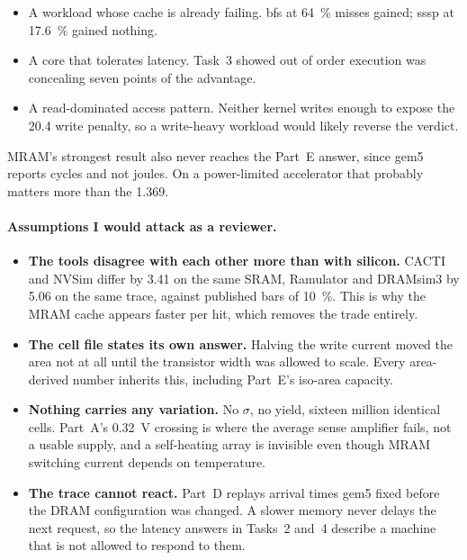 \documentclass[9pt,a4paper]{extarticle}
\begin{document}
\begin{itemize}
\item A workload whose cache is already failing. bfs at \SI{64}{\percent}
misses gained; sssp at \SI{17.6}{\percent} gained nothing.
\item A core that tolerates latency. Task~3 showed out of order execution
was concealing seven points of the advantage.
\item A read-dominated access pattern. Neither kernel writes enough to
expose the \SI{20.4}{\times} write penalty, so a write-heavy workload
would likely reverse the verdict.
\end{itemize}

MRAM's strongest result also never reaches the Part~E answer, since gem5
reports cycles and not joules. On a power-limited accelerator that
probably matters more than the \SI{1.369}{\times}.

\paragraph{Assumptions I would attack as a reviewer.}

\begin{itemize}
\item \textbf{The tools disagree with each other more than with silicon.}
CACTI and NVSim differ by \SI{3.41}{\times} on the same SRAM, Ramulator
and DRAMsim3 by \SI{5.06}{\times} on the same trace, against published
bars of \SI{10}{\percent}. This is why the MRAM cache appears faster per
hit, which removes the trade entirely.

\item \textbf{The cell file states its own answer.} Halving the write
current moved the area not at all until the transistor width was allowed
to scale. Every area-derived number inherits this, including Part~E's
iso-area capacity.

\item \textbf{Nothing carries any variation.} No $\sigma$, no yield,
sixteen million identical cells. Part~A's \SI{0.32}{V} crossing is where
the average sense amplifier fails, not a usable supply, and a self-heating
array is invisible even though MRAM switching current depends on
temperature.

\item \textbf{The trace cannot react.} Part~D replays arrival times gem5
fixed before the DRAM configuration was changed. A slower memory never
delays the next request, so the latency answers in Tasks~2 and~4 describe
a machine that is not allowed to respond to them.

\end{itemize}
\end{document}

